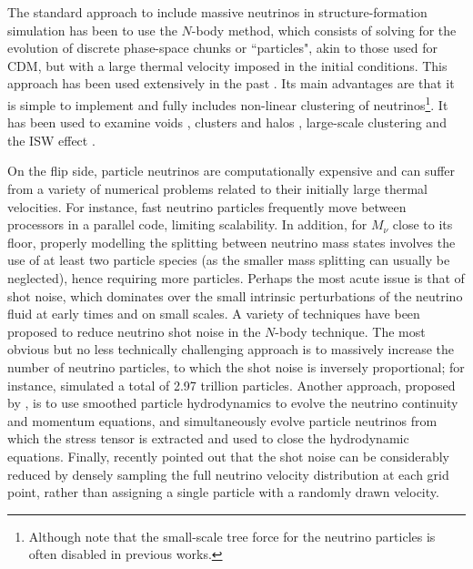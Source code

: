 \documentclass[useAMS, usenatbib]{mnras}
\begin{document}
The standard approach to include massive neutrinos in structure-formation simulation has been to use the $N$-body method, which consists of solving for the evolution of discrete phase-space chunks or ``particles", akin to those used for CDM, but with a
large thermal velocity imposed in the initial conditions. This approach has been used extensively in the past \cite[e.g.~][]{Brandbyge_2008, Bird_2012, Inman_2017, FVN_2017}. Its main advantages are that it is simple to implement and fully includes non-linear clustering of neutrinos\footnote{Although note that the small-scale tree force for the neutrino particles is often disabled in previous works.}. It has been used to examine voids \citep{Massara_2015}, clusters and halos \citep{FVN_2014, Castorina_2014, Costanzi_2013}, large-scale clustering \citep{Castorina_2015} and the ISW effect \citep{Carbone_2016}.

On the flip side, particle neutrinos are computationally expensive and can suffer from a variety of numerical problems related to their initially large thermal velocities. For instance, fast neutrino particles frequently move between processors in a parallel code, limiting scalability. In addition, for $M_\nu$ close to its floor, properly modelling the splitting between neutrino mass states involves the use of at least two particle species (as the smaller mass splitting can usually be neglected), hence requiring more particles. Perhaps the most acute issue is that of shot noise, which dominates over the small intrinsic perturbations of the neutrino fluid at early times and on small scales. %
A variety of techniques have been proposed to reduce neutrino shot noise in the $N$-body technique. The most obvious but no less technically challenging approach is to massively increase the number of neutrino particles, to which the shot noise is inversely proportional; for instance, \cite{Emberson_17} simulated a total of 2.97 trillion particles. Another approach, proposed by \cite{Banerjee_2016}, is to use smoothed particle hydrodynamics to evolve the neutrino continuity and momentum equations, and simultaneously evolve particle neutrinos from which the stress tensor is extracted and used to close the hydrodynamic equations. Finally, \cite{Banerjee_2018} recently pointed out that the shot noise can be considerably reduced by densely sampling the full neutrino velocity distribution at each grid point, rather than assigning a single particle with a randomly drawn velocity.
\end{document}
